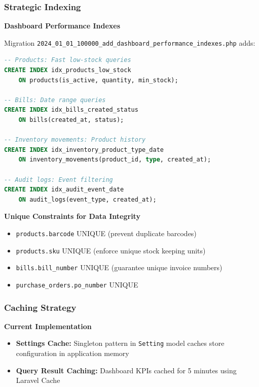 \subsubsection{Strategic Indexing}

\textbf{Dashboard Performance Indexes}

Migration \texttt{2024\_01\_01\_100000\_add\_dashboard\_performance\_indexes.php} adds:

\begin{lstlisting}[language=SQL]
-- Products: Fast low-stock queries
CREATE INDEX idx_products_low_stock 
    ON products(is_active, quantity, min_stock);

-- Bills: Date range queries
CREATE INDEX idx_bills_created_status 
    ON bills(created_at, status);

-- Inventory movements: Product history
CREATE INDEX idx_inventory_product_type_date 
    ON inventory_movements(product_id, type, created_at);

-- Audit logs: Event filtering
CREATE INDEX idx_audit_event_date 
    ON audit_logs(event_type, created_at);
\end{lstlisting}

\textbf{Unique Constraints for Data Integrity}

\begin{itemize}
    \item \texttt{products.barcode} UNIQUE (prevent duplicate barcodes)
    \item \texttt{products.sku} UNIQUE (enforce unique stock keeping units)
    \item \texttt{bills.bill\_number} UNIQUE (guarantee unique invoice numbers)
    \item \texttt{purchase\_orders.po\_number} UNIQUE
\end{itemize}

\subsubsection{Caching Strategy}

\textbf{Current Implementation}

\begin{itemize}
    \item \textbf{Settings Cache:} Singleton pattern in \texttt{Setting} model caches store configuration in application memory
    \item \textbf{Query Result Caching:} Dashboard KPIs cached for 5 minutes using Laravel Cache
\end{itemize}

